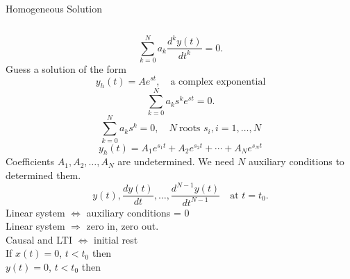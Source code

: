 \begin{frame}{Homogeneous Solution}

    \begin{columns}
            \begin{equation*}
                \sum_{k=0}^{N}a_k \frac{d^ky(t)}{dt^k} = 0.
            \end{equation*}
            Guess a solution of the form
            \begin{equation*}
                y_h(t) = Ae^{st}, \quad \text{a complex exponential}
            \end{equation*} \pause
            {
            \begin{equation*}
                \sum_{k=0}^{N}a_ks^k e^{st} = 0.
            \end{equation*}
            \pause
            \begin{equation*}
                \sum_{k=0}^{N}a_ks^k = 0, \quad N ~\text{roots } s_i, i = 1, \dots, N
            \end{equation*}
            }
            \pause
            \begin{equation*}
                y_h(t) = A_1e^{s_1t} + A_2e^{s_2t} + \cdots + A_Ne^{s_Nt}
            \end{equation*}
            Coefficients $A_1, A_2, \dots, A_N$ are undetermined. We need $N$ auxiliary conditions to determined them.
            \begin{equation*}
                y(t), \frac{dy(t)}{dt}, \dots, \frac{d^{N-1}y(t)}{dt^{N-1}}\quad \text{at } t= t_0.
            \end{equation*}
            \pause
            Linear system $\Longleftrightarrow$ auxiliary conditions = 0\\
            Linear system $\Rightarrow$ zero in, zero out.\\
            Causal and LTI $\Longleftrightarrow$ initial rest\\
            If $x(t) = 0$, $t<t_0$ then\\
            $y(t) = 0$, $t<t_0$ then
    \end{columns}

\end{frame}


